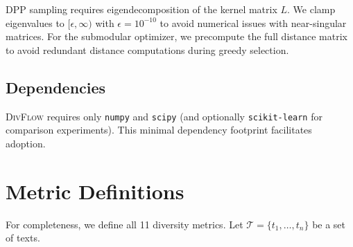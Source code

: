 \documentclass[11pt]{article}
\begin{document}
DPP sampling requires eigendecomposition of the kernel matrix $L$.
We clamp eigenvalues to $[\epsilon, \infty)$ with $\epsilon = 10^{-10}$
to avoid numerical issues with near-singular matrices. For the
submodular optimizer, we precompute the full distance matrix to
avoid redundant distance computations during greedy selection.

\subsection{Dependencies}

\textsc{DivFlow} requires only \texttt{numpy} and \texttt{scipy}
(and optionally \texttt{scikit-learn} for comparison experiments).
This minimal dependency footprint facilitates adoption.

\section{Metric Definitions}
\label{app:metrics}

For completeness, we define all 11 diversity metrics.
Let $\mathcal{T} = \{t_1, \ldots, t_n\}$ be a set of texts.
\end{document}
